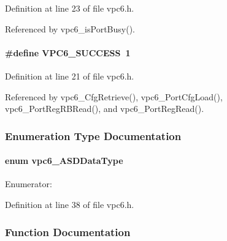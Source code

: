Definition at line 23 of file vpc6.h.

Referenced by vpc6\_\-isPortBusy().
\paragraph[{VPC6\_\-SUCCESS}]{\setlength{\rightskip}{0pt plus 5cm}\#define VPC6\_\-SUCCESS~1}\hfill\label{vpc6_8h_a495f6ffc0940948571822aaff544466d}


Definition at line 21 of file vpc6.h.

Referenced by vpc6\_\-CfgRetrieve(), vpc6\_\-PortCfgLoad(), vpc6\_\-PortRegRBRead(), and vpc6\_\-PortRegRead().

\subsubsection{Enumeration Type Documentation}
\paragraph[{vpc6\_\-ASDDataType}]{\setlength{\rightskip}{0pt plus 5cm}enum {\bf vpc6\_\-ASDDataType}}\hfill\label{vpc6_8h_aa38fa3ba896c103fa4999d08c159fb26}
\begin{Desc}
\item[Enumerator: ]\par
\begin{description}
\item[{\em 
vpc6\_\-asd\_\-ch1\_\-8\label{vpc6_8h_aa38fa3ba896c103fa4999d08c159fb26af6c0f9a808832e304700e21daf672cb5}
}]\item[{\em 
vpc6\_\-asd\_\-ch9\_\-16\label{vpc6_8h_aa38fa3ba896c103fa4999d08c159fb26aa3267ec8599d5e186280974a2e812d8f}
}]\end{description}
\end{Desc}



Definition at line 38 of file vpc6.h.

\subsubsection{Function Documentation}
